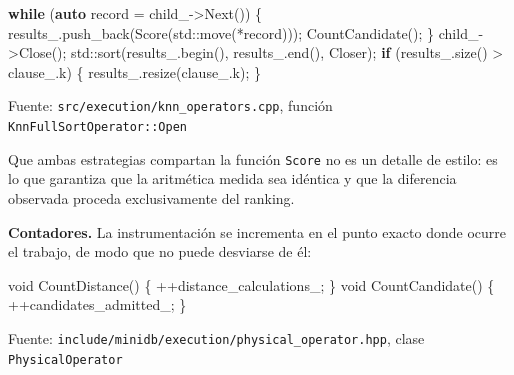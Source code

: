 \documentclass[11pt,a4paper]{article}
\newenvironment{Shaded}{}{}
\newcommand{\BuiltInTok}[1]{\textcolor[rgb]{0.00,0.50,0.00}{#1}}
\newcommand{\ControlFlowTok}[1]{\textcolor[rgb]{0.00,0.44,0.13}{\textbf{#1}}}
\newcommand{\DataTypeTok}[1]{\textcolor[rgb]{0.56,0.13,0.00}{#1}}
\newcommand{\KeywordTok}[1]{\textcolor[rgb]{0.00,0.44,0.13}{\textbf{#1}}}
\newcommand{\NormalTok}[1]{#1}
\newcommand{\OperatorTok}[1]{\textcolor[rgb]{0.40,0.40,0.40}{#1}}
\newcommand{\VariableTok}[1]{\textcolor[rgb]{0.10,0.09,0.49}{#1}}
\begin{document}
\begin{Shaded}
\begin{Highlighting}[]
\ControlFlowTok{while} \OperatorTok{(}\KeywordTok{auto}\NormalTok{ record }\OperatorTok{=} \VariableTok{child\_}\OperatorTok{{-}\textgreater{}}\NormalTok{Next}\OperatorTok{())} \OperatorTok{\{}
    \VariableTok{results\_}\OperatorTok{.}\NormalTok{push\_back}\OperatorTok{(}\NormalTok{Score}\OperatorTok{(}\BuiltInTok{std::}\NormalTok{move}\OperatorTok{(*}\NormalTok{record}\OperatorTok{)));}
\NormalTok{    CountCandidate}\OperatorTok{();}
\OperatorTok{\}}
\VariableTok{child\_}\OperatorTok{{-}\textgreater{}}\NormalTok{Close}\OperatorTok{();}
\BuiltInTok{std::}\NormalTok{sort}\OperatorTok{(}\VariableTok{results\_}\OperatorTok{.}\NormalTok{begin}\OperatorTok{(),} \VariableTok{results\_}\OperatorTok{.}\NormalTok{end}\OperatorTok{(),}\NormalTok{ Closer}\OperatorTok{);}
\ControlFlowTok{if} \OperatorTok{(}\VariableTok{results\_}\OperatorTok{.}\NormalTok{size}\OperatorTok{()} \OperatorTok{\textgreater{}} \VariableTok{clause\_}\OperatorTok{.}\NormalTok{k}\OperatorTok{)} \OperatorTok{\{}
    \VariableTok{results\_}\OperatorTok{.}\NormalTok{resize}\OperatorTok{(}\VariableTok{clause\_}\OperatorTok{.}\NormalTok{k}\OperatorTok{);}
\OperatorTok{\}}
\end{Highlighting}
\end{Shaded}

Fuente: \texttt{src/execution/knn\_operators.cpp}, función
\texttt{KnnFullSortOperator::Open}

Que ambas estrategias compartan la función \texttt{Score} no es un
detalle de estilo: es lo que garantiza que la aritmética medida sea
idéntica y que la diferencia observada proceda exclusivamente del
ranking.

\textbf{Contadores.} La instrumentación se incrementa en el punto exacto
donde ocurre el trabajo, de modo que no puede desviarse de él:

\begin{Shaded}
\begin{Highlighting}[]
\DataTypeTok{void}\NormalTok{ CountDistance}\OperatorTok{()} \OperatorTok{\{} \OperatorTok{++}\VariableTok{distance\_calculations\_}\OperatorTok{;} \OperatorTok{\}}
\DataTypeTok{void}\NormalTok{ CountCandidate}\OperatorTok{()} \OperatorTok{\{} \OperatorTok{++}\VariableTok{candidates\_admitted\_}\OperatorTok{;} \OperatorTok{\}}
\end{Highlighting}
\end{Shaded}

Fuente: \texttt{include/minidb/execution/physical\_operator.hpp}, clase
\texttt{PhysicalOperator}
\end{document}
